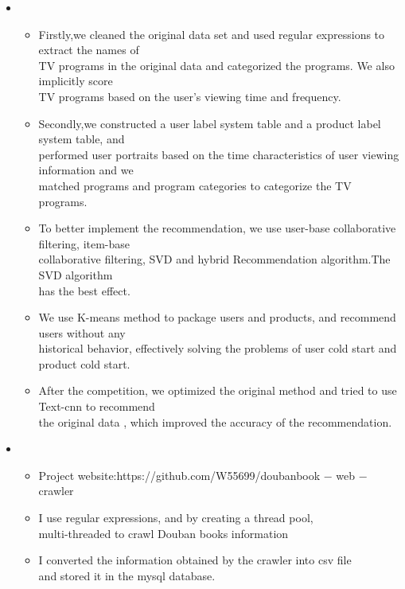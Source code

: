 \begin{itemize}[leftmargin=*]
    \item
      {\small
      \begin{itemize}
        \item Firstly,we cleaned the original data set and used regular expressions to extract the names of \\TV programs in the original data and categorized the programs. We also implicitly score\\ TV programs based on the user's viewing time and frequency.
        \item Secondly,we constructed a user label system table and a product label system table, and \\performed user portraits based on the time characteristics of user viewing information and we \\matched programs and program categories
to categorize the TV programs.
        \item  To better implement the recommendation, we use  user-base collaborative filtering, item-base \\collaborative filtering, SVD and hybrid Recommendation algorithm.The SVD algorithm\\ has the best effect.
		\item We use K-means method to package users and products, and recommend users without any \\ historical behavior, effectively solving the problems of user cold start and product cold start.
        \item After the competition, we optimized the original method and tried to use Text-cnn to recommend \\the original data , which improved the accuracy of the recommendation.
      \end{itemize}
      }
    \item
      {\small
      \begin{itemize}
       \item Project website:https://github.com/W55699/doubanbook − web − crawler
       \item I use regular expressions, and by creating a thread pool,\\ multi-threaded to crawl Douban books information
       \item I converted the information obtained by the crawler into csv file\\ and stored it in the mysql database.

\end{itemize}}
\end{itemize}
